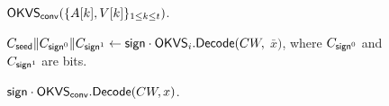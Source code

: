 \begin{figure}
{{\begin{algorithmic}[1]
        \EndFor 
        \State \Return ${\sf OKVS}_{\sf conv}(\{A[k], V[k]\}_{1\le k\le t})$. 
      \EndProcedure
      \item[]
        \State\Return $C_{{\sf seed}}\|C_{{\sf sign}^0}\|C_{{\sf sign}^1}\gets{\sf sign}\cdot{\sf OKVS}_i.{\sf Decode}(CW,$ $\bar{x})$, where $C_{{\sf sign}^0}$ and $C_{{\sf sign}^1}$ are bits. \label{alg:okvs_correction}
      \EndProcedure
      \item[]
        \State \Return ${\sf sign}\cdot{\sf OKVS}_{\sf conv}.{\sf Decode}(CW,x)$. \label{alg:okvs_convert_correction}
      \EndProcedure
    \end{algorithmic}}}
  \end{figure}
